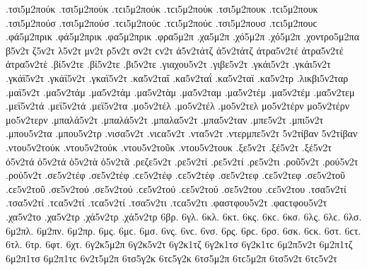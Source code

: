 {.τσι5μ2πούκ .τσι5μ2πούκ .τϲι5μ2πούκ .τϲι5μ2πούκ   %
.τσι5μ2πουκ .τϲι5μ2πουκ
.τσι5μ2πούσ .τσι5μ2πούσ .τϲι5μ2πούϲ .τϲι5μ2πούϲ   %
.τσι5μ2πουσ .τϲι5μ2πουϲ
.φά5μ2πρικ .φά5μ2πρικ   %
.φα5μ2πρικ
.φρα5μ2π   %
.χα5μ2π   %
.χό5μ2π .χό5μ2π   %
.χοντρο5μ2πα   %
β5ν2τ
ζ5ν2τ
λ5ν2τ
μν2τ
ρ5ν2τ
σν2τ ϲν2τ
ἀ5ν2τάτζ ἀ5ν2τάτζ   %
ἀτρα5ν2τέ ἀτρα5ν2τέ   %
ἀτρα5ν2τὲ
.βί5ν2τε .βί5ν2τε   %
.βι5ν2τε
.γιαχου5ν2τ   %
.γιβε5ν2τ   %
.γκάι5ν2τ .γκάι5ν2τ   %
.γκάϊ5ν2τ .γκάϊ5ν2τ
.γκαϊ5ν2τ
.κα5ν2ταΐ .κα5ν2ταΐ   %
.κα5ν2ταϊ
.κα5ν2τρ   %
.λικβι5ν2ταρ   %
.μαϊ5ν2τ   %
.μα5ν2τάμ .μα5ν2τάμ   %
.μα5ν2τὰμ
.μα5ν2ταμ
.μα5ν2τέμ .μα5ν2τέμ   %
.μα5ν2τεμ
.μεϊ5ν2τά .μεϊ5ν2τά   %
.μεϊ5ν2τα
.μο5ν2τέλ .μο5ν2τέλ   %
.μο5ν2τελ
μο5ν2τέρν μο5ν2τέρν   %
μο5ν2τερν
.μπαλά5ν2τ .μπαλά5ν2τ   %
.μπαλα5ν2τ
.μπα5ν2ταν   %
.μπε5ν2τ   %
.μπι5ν2τ   %
.μπου5ν2τα   %
.μπου5ν2τρ   %
.νισα5ν2τ .νιϲα5ν2τ   %
.ντα5ν2τ   %
.ντερμπε5ν2τ   %
5ν2τίβαν 5ν2τίβαν   %
.ντου5ν2τούκ .ντου5ν2τούκ   %
.ντου5ν2τοῦκ
.ντου5ν2τουκ
.ξε5ν2τ   %
.ξέ5ν2τ .ξέ5ν2τ
ὀ5ν2τά ὀ5ν2τά   %
ὀ5ν2τὰ
ὀ5ν2τᾶ
.ρεζε5ν2τ   %
.ρε5ν2τί .ρε5ν2τί   %
.ρε5ν2τι
.ροῦ5ν2τ   %
.ρού5ν2τ .ρού5ν2τ
.σε5ν2τέφ .σε5ν2τέφ .ϲε5ν2τέφ .ϲε5ν2τέφ   %
.σε5ν2τεφ .ϲε5ν2τεφ
.σε5ν2τοῦ .ϲε5ν2τοῦ   %
.σε5ν2τού .σε5ν2τού .ϲε5ν2τού .ϲε5ν2τού
.σε5ν2του .ϲε5ν2του
.τσα5ν2τί .τσα5ν2τί .τϲα5ν2τί .τϲα5ν2τί   %
.τσα5ν2τι .τϲα5ν2τι
.φαστφου5ν2τ .φαϲτφου5ν2τ   %
.χα5ν2το   %
.χα5ν2τρ   %
.χά5ν2τρ .χά5ν2τρ
6βρ.   %
6γλ.   %
6κλ.   %
6κτ.   %
6κς. 6κϲ.   %
6κσ.
6λς. 6λϲ.   %
6λσ.
6μ2πλ.   %
6μ2πν.   %
6μ2πρ.   %
6μς. 6μϲ.   %
6μσ.
6νς. 6νϲ.   %
6νσ.
6ρς. 6ρϲ.   %
6ρσ.
6σκ. 6ϲκ.   %
6στ. 6ϲτ.   %
6τλ.   %
6τρ.   %
6φτ.   %
6χτ.   %
6γ2κ5μ2π
6γ2κ5ν2τ
6γ2κ1τζ
6γ2κ1τσ 6γ2κ1τϲ
6μ2π5ν2τ
6μ2π1τζ
6μ2π1τσ 6μ2π1τϲ
6ν2τ5μ2π
6τσ5γ2κ 6τϲ5γ2κ
6τσ5μ2π 6τϲ5μ2π
6τσ5ν2τ 6τϲ5ν2τ
}

